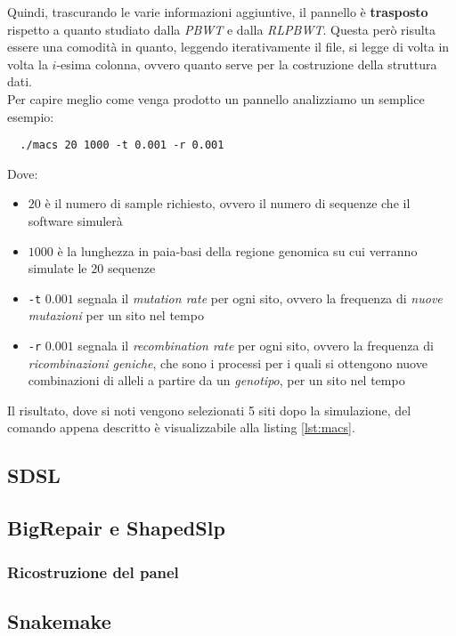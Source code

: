 Quindi, trascurando le varie informazioni aggiuntive, il pannello è
\textbf{trasposto} rispetto a quanto studiato dalla \textit{PBWT} e dalla
\textit{RLPBWT}. Questa però risulta essere una comodità in quanto, leggendo
iterativamente il file, si legge di volta in volta la $i$-esima colonna, ovvero
quanto serve per la costruzione della struttura dati.\\
Per capire meglio come venga prodotto un pannello analizziamo un semplice
esempio:
\begin{verbatim}
  ./macs 20 1000 -t 0.001 -r 0.001
\end{verbatim}
Dove:
\begin{itemize}
  \item $20$ è il numero di sample richiesto, ovvero il numero di sequenze che
  il software simulerà
  \item $1000$ è la lunghezza in paia-basi della regione genomica su cui
  verranno simulate le $20$ sequenze
  \item \texttt{-t} $0.001$ segnala il \textit{mutation rate} per ogni sito,
  ovvero la frequenza di \textit{nuove mutazioni} per un sito nel tempo 
  \item \texttt{-r} $0.001$ segnala il \textit{recombination rate} per ogni
  sito, ovvero la frequenza di \textit{ricombinazioni geniche}, che sono i
  processi per i quali si ottengono nuove combinazioni di alleli a partire da un
  \textit{genotipo}, per un sito nel tempo 
\end{itemize}
Il risultato, dove si noti vengono selezionati 5 siti dopo la simulazione, del
comando appena descritto è visualizzabile alla listing \ref{lst:macs}. 

\subsection{SDSL}
\subsection{BigRepair e ShapedSlp}
\subsubsection{Ricostruzione del panel}
\subsection{Snakemake}